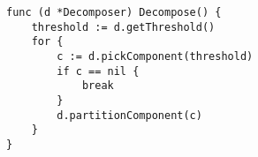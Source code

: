 \begin{lstlisting}[caption=Decompose main loop,label=lst:decompose_main,float,floatplacement=H]
func (d *Decomposer) Decompose() {
    threshold := d.getThreshold()
    for {
        c := d.pickComponent(threshold)
        if c == nil {
            break
        }
        d.partitionComponent(c)
    }
}
\end{lstlisting}